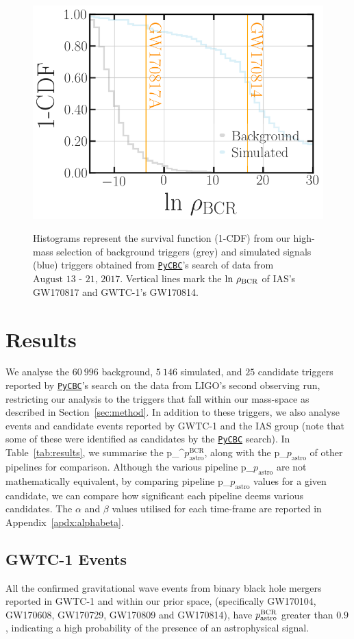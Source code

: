 \documentclass[%
 nofootinbib,
 amsmath,amssymb,
 aps,
 twocolumn
]{revtex4-2}
\newcommand{\pycbc}{{\sc \href{https://pycbc.org/}{\texttt{PyCBC}}}\xspace}
\newcommand{\fancytext}[1]{{\relax\ifmmode#1\else $#1$\fi}\xspace}
\newcommand{\mathcmd}[1]{{\sc \relax\ifmmode#1\else $#1$\fi}\xspace}
\newcommand{\bcr}{\mathcmd{\rho_\text{BCR}}}
\newcommand{\pastro}{\fancytext{p_\text{astro}}}
\newcommand{\pastrobcr}{\fancytext{p_\text{astro}^{\text{BCR}}}}
\begin{document}
\begin{figure}[!ht]
{\centering \includegraphics[width=0.75\linewidth]{images/bcr_cdf_smaller_legend.png} }
\caption[BCR distribution example]{Histograms represent the survival function (1-CDF) from our high-mass selection of background triggers (grey) and simulated signals (blue) triggers obtained from \pycbc's search of data from $\text{August 13 - 21, 2017}$. Vertical lines mark the $\text{ln}\ \bcr$ of IAS's GW170817 and GWTC-1's GW170814.}\label{fig:bcrCdf}
\end{figure}


\section{\label{sec:Results}Results}


We analyse the $60\ 996$ background, $5\ 146$ simulated, and $25$ candidate triggers reported by \pycbc's search on the data from LIGO's second observing run, restricting our analysis to the triggers that fall within our mass-space as described in Section~\ref{sec:method}. In addition to these triggers, we also analyse events and candidate events reported by GWTC-1 and the IAS group (note that some of these were identified as candidates by the \pycbc search). In Table~\ref{tab:results}, we summarise the \pastrobcr, along with the \pastro of other pipelines for comparison. Although the various pipeline \pastro are not mathematically equivalent, by comparing pipeline \pastro values for a given candidate, we can compare how significant each pipeline deems various candidates. The $\alpha$ and $\beta$ values utilised for each time-frame are reported in Appendix~\ref{apdx:alphabeta}.

\subsection{GWTC-1 Events}
All the confirmed gravitational wave events from binary black hole mergers reported in GWTC-1 and within our prior space, (specifically GW170104, GW170608, GW170729, GW170809 and GW170814), have $\pastrobcr$ greater than $0.9$, indicating a high probability of the presence of an astrophysical signal. 
\end{document}
